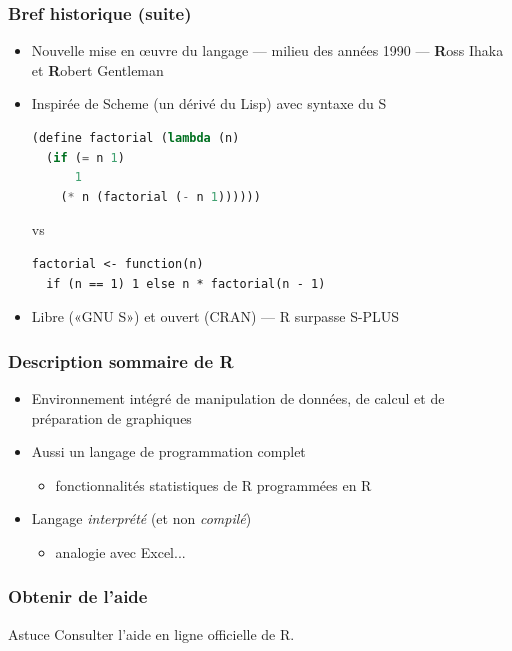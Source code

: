 \begin{frame}[fragile=singleslide]
  \frametitle{Bref historique (suite)}

  \begin{itemize}
  \item Nouvelle mise en {\oe}uvre du langage --- milieu des années
    1990 --- \textbf{R}oss Ihaka et \textbf{R}obert Gentleman
  \item Inspirée de Scheme (un dérivé du Lisp) avec syntaxe du S
\begin{Schunk}
\begin{lstlisting}[language=lisp]
(define factorial (lambda (n)
  (if (= n 1)
      1
    (* n (factorial (- n 1))))))
\end{lstlisting}
\end{Schunk}
vs
\begin{Schunk}
\begin{lstlisting}
factorial <- function(n)
  if (n == 1) 1 else n * factorial(n - 1)
\end{lstlisting}
\end{Schunk}
  \item Libre («GNU S») et ouvert (CRAN) --- R surpasse S-PLUS
  \end{itemize}
\end{frame}

\begin{frame}
  \frametitle{Description sommaire de R}

  \begin{itemize}
  \item Environnement intégré de manipulation de données, de calcul et
    de préparation de graphiques
  \item Aussi un langage de programmation complet
    \begin{itemize}
    \item fonctionnalités statistiques de R programmées en R
    \end{itemize}
  \item Langage \emph{interprété} (et non \emph{compilé})
    \begin{itemize}
    \item analogie avec Excel...
    \end{itemize}
  \end{itemize}

  \pause
\end{frame}

\begin{frame}
  \frametitle{Obtenir de l'aide}

  \begin{alertblock}{Astuce}
    Consulter l'aide en ligne officielle de R.
  \end{alertblock}
\end{frame}

